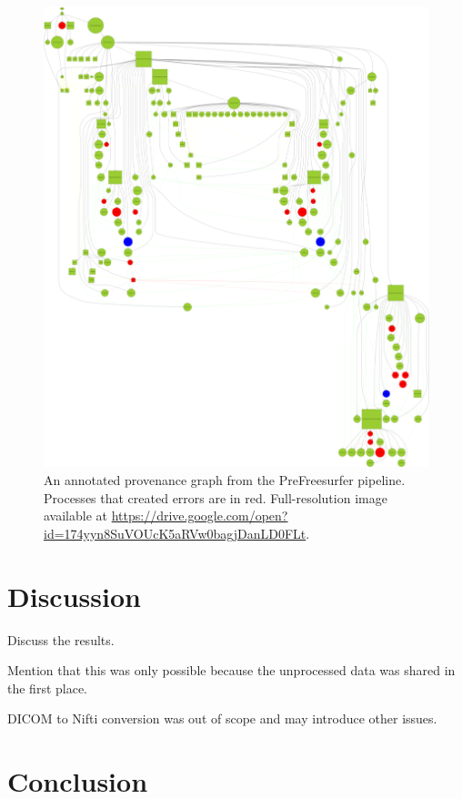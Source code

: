 \documentclass{article}
\begin{document}
\begin{figure}
  \includegraphics[width=\linewidth]{images/graph}
  \caption{An annotated provenance graph from the PreFreesurfer pipeline. Processes that created errors are in red. 
Full-resolution image available at \url{https://drive.google.com/open?id=174yyn8SuVOUcK5aRVw0bagjDanLD0FLt}.}
  \label{fig:2}
\end{figure}

\section{Discussion}

Discuss the results.

Mention that this was only possible because the unprocessed data was shared in the first place.

DICOM to Nifti conversion was out of scope and may introduce other issues.

\section{Conclusion}
\end{document}
